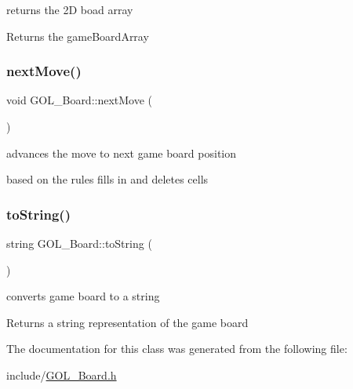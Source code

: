 returns the 2D boad array 

\begin{DoxyReturn}{Returns}
the game\+Board\+Array 
\end{DoxyReturn}
\mbox{\label{class_g_o_l___board_a0d555031e589a326adb485289a0a8a68}} 
\subsubsection{\texorpdfstring{next\+Move()}{nextMove()}}
{\footnotesize\ttfamily void G\+O\+L\+\_\+\+Board\+::next\+Move (\begin{DoxyParamCaption}{ }\end{DoxyParamCaption})}



advances the move to next game board position 

based on the rules fills in and deletes cells \mbox{\label{class_g_o_l___board_a9ef0e2f7c255f0bb486c8a31e392f284}} 
\subsubsection{\texorpdfstring{to\+String()}{toString()}}
{\footnotesize\ttfamily string G\+O\+L\+\_\+\+Board\+::to\+String (\begin{DoxyParamCaption}{ }\end{DoxyParamCaption})}



converts game board to a string 

\begin{DoxyReturn}{Returns}
a string representation of the game board 
\end{DoxyReturn}


The documentation for this class was generated from the following file\+:\begin{DoxyCompactItemize}
\item 
include/\hyperlink{_g_o_l___board_8h}{G\+O\+L\+\_\+\+Board.\+h}\end{DoxyCompactItemize}
